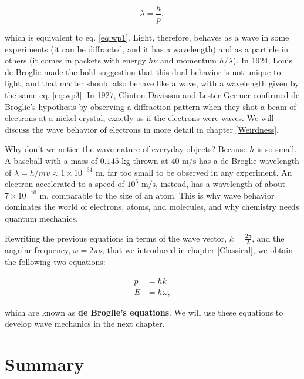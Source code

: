 \documentclass[
  english,
  9pt,
]{extbook}
\theoremstyle{definition}
\theoremstyle{definition}
\theoremstyle{definition}
\theoremstyle{definition}
\theoremstyle{remark}
\begin{document}
\begin{equation}
\lambda = \frac{h}{p},
\label{eq:wp3}
\end{equation}

which is equivalent to eq. \eqref{eq:wp1}. Light, therefore, behaves as a wave in some experiments (it can be diffracted, and it has a wavelength) and as a particle in others (it comes in packets with energy \(h \nu\) and momentum \(h/\lambda\)). In 1924, Louis de Broglie made the bold suggestion that this dual behavior is not unique to light, and that matter should also behave like a wave, with a wavelength given by the same eq. \eqref{eq:wp3}. In 1927, Clinton Davisson and Lester Germer confirmed de Broglie's hypothesis by observing a diffraction pattern when they shot a beam of electrons at a nickel crystal, exactly as if the electrons were waves. We will discuss the wave behavior of electrons in more detail in chapter \ref{Weirdness}.

Why don't we notice the wave nature of everyday objects? Because \(h\) is so small. A baseball with a mass of \(0.145\text{ kg}\) thrown at \(40\text{ m/s}\) has a de Broglie wavelength of \(\lambda = h/mv \approx 1\times10^{-34}\text{ m}\), far too small to be observed in any experiment. An electron accelerated to a speed of \(10^6\text{ m/s}\), instead, has a wavelength of about \(7\times10^{-10}\text{ m}\), comparable to the size of an atom. This is why wave behavior dominates the world of electrons, atoms, and molecules, and why chemistry needs quantum mechanics.

Rewriting the previous equations in terms of the wave vector, \(k=\frac{2\pi}{\lambda}\), and the angular frequency, \(\omega=2\pi\nu\), that we introduced in chapter \ref{Classical}, we obtain the following two equations:

\begin{equation}
\begin{aligned}
p &= \hbar k \\
E &= \hbar \omega,
\end{aligned}
\label{eq:wp1b}
\end{equation}

which are known as \textbf{de Broglie's equations}. We will use these equations to develop wave mechanics in the next chapter.

\section{Summary}\label{summary}
\end{document}
